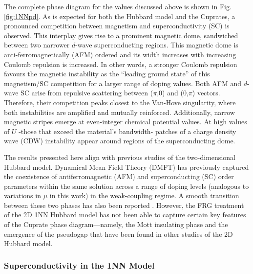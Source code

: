 \documentclass[11pt]{article}
\begin{document}
\medskip
\noindent The complete phase diagram for the values discussed above is shown in Fig.\ref{fig:1NNpd}. As is expected
for both the Hubbard model and the Cuprates\cite{kivelson1998electronic,fradkin2015colloquium,vanhala2018dynamical}, a pronounced competition between magnetism and 
superconductivity (SC) is observed. This interplay gives rise to a prominent magnetic dome, sandwiched between two narrower $d$-wave superconducting regions. This magnetic dome is 
anti-ferromagnetically (AFM) ordered and its width increases with increasing Coulomb repulsion is increased. In other words, a stronger Coulomb repulsion favours the magnetic instability as the ``leading ground state'' of this magnetism/SC competition 
for a larger range of doping values. Both AFM and $d$-wave SC arise from repulsive scattering between
($\pi$,0) and (0,$\pi$) vectors. Therefore, their competition peaks closest to the Van-Hove singularity, where both instabilities are amplified and mutually reinforced\cite{furukawa1998truncation,honerkamp2001temperature}.
Additionally, narrow magnetic stripes emerge at even-integer chemical potential values. At high values of $U$ -those that exceed the material's bandwidth- patches of a charge density wave (CDW) instability appear around regions of the superconducting dome.\par

\medskip

\noindent The results presented here align with previous studies of the two-dimensional Hubbard model. Dynamical Mean Field Theory (DMFT) has 
previously captured the coexistence of antiferromagnetic (AFM) and superconducting (SC) order parameters within the same solution across a range of doping levels (analogous to variations in 
$\mu$ in this work) in the weak-coupling regime\cite{capone2006competition}. A smooth transition between these two phases has also been reported \cite{capone2006competition}. However, the FRG treatment of the 2D 1NN Hubbard model has not been able to capture certain key features
of the Cuprate phase diagram—namely, the Mott insulating phase and the emergence of the pseudogap that have been found in other studies of the 2D Hubbard model\cite{katanin2009comparing,otsuki2014superconductivity}.






\subsubsection{Superconductivity in the 1NN Model}
\end{document}
